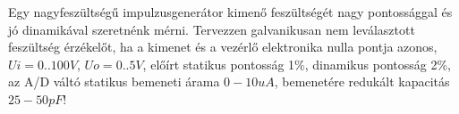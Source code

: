 \begin{example}

Egy nagyfeszültségű impulzusgenerátor kimenő feszültségét nagy pontossággal és jó dinamikával szeretnénk mérni. Tervezzen galvanikusan nem leválasztott feszültség érzékelőt, ha a kimenet és a vezérlő elektronika nulla pontja azonos, $Ui=0..100V$, $Uo=0..5V$, előírt statikus pontosság 1\%, dinamikus pontosság 2\%, az A/D váltó statikus bemeneti árama $0-10uA$, bemenetére redukált kapacitás $25-50pF$!

\tcbline
\vspace{1mm}

\solution

\end{example}